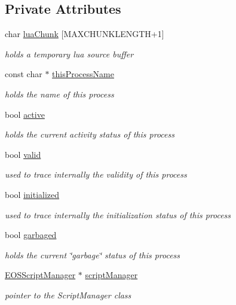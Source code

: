 \subsection*{Private Attributes}
\begin{CompactItemize}
\item 
char \hyperlink{classEOSProcess_318b6a6c7ab85ac4b9ecad280cd3fe5d}{luaChunk} \mbox{[}MAXCHUNKLENGTH+1\mbox{]}
\begin{CompactList}\small\item\em holds a temporary lua source buffer \item\end{CompactList}\item 
const char $\ast$ \hyperlink{classEOSProcess_19fe017cf86629e8783b745e5f88a5a7}{thisProcessName}
\begin{CompactList}\small\item\em holds the name of this process \item\end{CompactList}\item 
bool \hyperlink{classEOSProcess_223622c13ea24b06079078ac0910925f}{active}
\begin{CompactList}\small\item\em holds the current activity status of this process \item\end{CompactList}\item 
bool \hyperlink{classEOSProcess_69b4f5d326f9fbbda1ddad22b42f80b9}{valid}
\begin{CompactList}\small\item\em used to trace internally the validity of this process \item\end{CompactList}\item 
bool \hyperlink{classEOSProcess_97ff1c226411207b2fe0582b1b67603b}{initialized}
\begin{CompactList}\small\item\em used to trace internally the initialization status of this process \item\end{CompactList}\item 
bool \hyperlink{classEOSProcess_a3bc6045894d86d9d64d9ad8ab610684}{garbaged}
\begin{CompactList}\small\item\em holds the current \char`\"{}garbage\char`\"{} status of this process \item\end{CompactList}\item 
\hyperlink{classEOSScriptManager}{EOSScriptManager} $\ast$ \hyperlink{classEOSProcess_86d146cc56d2a9aa68fdb6ab3ded52f0}{scriptManager}
\begin{CompactList}\small\item\em pointer to the ScriptManager class \item\end{CompactList}\end{CompactItemize}


